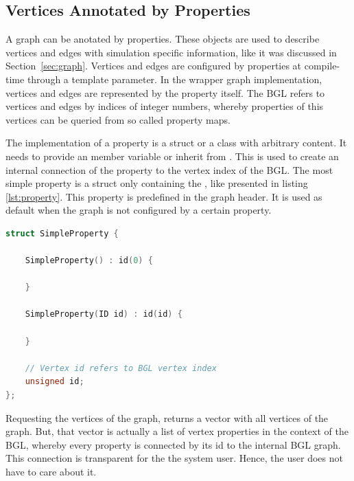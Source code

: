 \subsection{Vertices Annotated by Properties}

A graph can be anotated by properties. These objects are used to
describe vertices and edges with simulation specific information, like
it was discussed in Section~\ref{sec:graph}. Vertices and edges are
configured by properties at compile-time through a template
parameter. In the wrapper graph implementation, vertices and edges are
represented by the property itself. The BGL refers to vertices and
edges by indices of integer numbers, whereby properties of this
vertices can be queried from so called property maps.

The implementation of a property is a struct or a class with arbitrary
content. It needs to provide an  member variable or inherit
from . This  is used to create an internal
connection of the property to the vertex index of the BGL.  The most
simple property is a struct only containing the , like
presented in listing \ref{lst:property}. This property is predefined
in the graph header. It is used as default when the graph is
not configured by a certain property.

\begin{lstlisting}[language=C++, label=lst:property]
struct SimpleProperty {

    SimpleProperty() : id(0) {

    }
    
    SimpleProperty(ID id) : id(id) {

    }

    // Vertex id refers to BGL vertex index
    unsigned id;
};
\end{lstlisting}

\noindent Requesting the vertices of the graph, returns a vector with
all vertices of the graph. But, that vector is actually a list of
vertex properties in the context of the BGL, whereby every property is
connected by its id to the internal BGL graph. This connection is
transparent for the the system user. Hence, the user does not have to
care about it.

